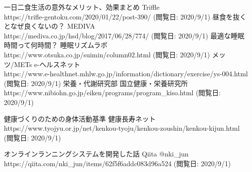 \documentclass[titlepage]{jsarticle}
\begin{document}
    
\begin{thebibliography}{99}
     一日二食生活の意外なメリット、効果まとめ Triffle \\
        https://trifle-gentoku.com/2020/01/22/post-390/
        (閲覧日: 2020/9/1)
     昼食を抜くとなぜ良くないの？ MEDIVA \\
            https://mediva.co.jp/hsd/blog/2017/06/28/774/
        (閲覧日: 2020/9/1)
     最適な睡眠時間って何時間？ 睡眠リズムラボ \\
        https://www.otsuka.co.jp/suimin/column02.html
        (閲覧日: 2020/9/1)
    \bibitem{} メッツ/METs e-ヘルスネット \\
        https://www.e-healthnet.mhlw.go.jp/information/dictionary/exercise/ys-004.html \\
        (閲覧日: 2020/9/1)
    \bibitem{} 栄養・代謝研究部 国立健康・栄養研究所 \\
        https://www.nibiohn.go.jp/eiken/programs/program\_kiso.html
        (閲覧日: 2020/9/1)
        
    \bibitem{} 健康づくりのための身体活動基準 健康長寿ネット \\
        https://www.tyojyu.or.jp/net/kenkou-tyoju/kenkou-zoushin/kenkou-kijun.html \\
        (閲覧日: 2020/9/1)
    
     オンラインランニングシステムを開発した話 Qiita @nki\_jun \\
        https://qiita.com/nki\_jun/items/62f5f6addc083d96a524
        (閲覧日: 2020/9/1)
\end{thebibliography}
\end{document}
